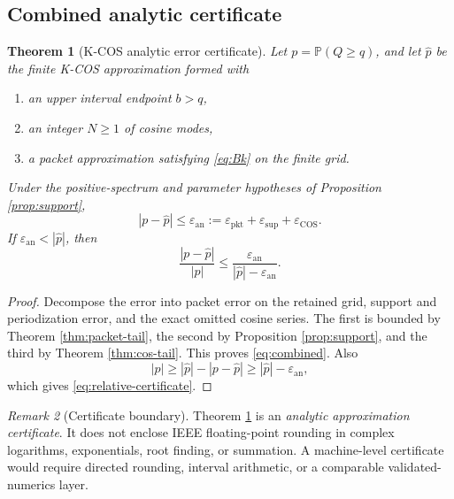 \documentclass[11pt]{article}
\newtheorem{theorem}{Theorem}[section]
\theoremstyle{definition}
\theoremstyle{remark}
\newtheorem{remark}[theorem]{Remark}
\newcommand{\Pp}{\mathbb P}
\newcommand{\eps}{\varepsilon}
\begin{document}
\subsection{Combined analytic certificate}

\begin{theorem}[K-COS analytic error certificate]
\label{thm:combined}
Let $p=\Pp(Q\ge q)$, and let $\widehat p$ be the finite K-COS approximation formed with
\begin{enumerate}[label=(\roman*)]
\item an upper interval endpoint $b>q$,
\item an integer $N\ge1$ of cosine modes,
\item a packet approximation satisfying \eqref{eq:Bk} on the finite grid.
\end{enumerate}
Under the positive-spectrum and parameter hypotheses of Proposition \ref{prop:support},
\begin{equation}
|p-\widehat p|
\le
\eps_{\mathrm{an}}
:=\eps_{\mathrm{pkt}}+\eps_{\mathrm{sup}}+\eps_{\mathrm{COS}}.
\label{eq:combined}
\end{equation}
If $\eps_{\mathrm{an}}<|\widehat p|$, then
\begin{equation}
\frac{|p-\widehat p|}{|p|}
\le
\frac{\eps_{\mathrm{an}}}
{|\widehat p|-\eps_{\mathrm{an}}}.
\label{eq:relative-certificate}
\end{equation}
\end{theorem}

\begin{proof}
Decompose the error into packet error on the retained grid, support and periodization error, and the exact omitted cosine series. The first is bounded by Theorem \ref{thm:packet-tail}, the second by Proposition \ref{prop:support}, and the third by Theorem \ref{thm:cos-tail}. This proves \eqref{eq:combined}. Also
\[
|p|\ge |\widehat p|-|p-\widehat p|
\ge |\widehat p|-\eps_{\mathrm{an}},
\]
which gives \eqref{eq:relative-certificate}.
\end{proof}

\begin{remark}[Certificate boundary]\label{claim:final-26-12}
Theorem \ref{thm:combined} is an \emph{analytic approximation certificate}. It does not enclose IEEE floating-point rounding in complex logarithms, exponentials, root finding, or summation. A machine-level certificate would require directed rounding, interval arithmetic, or a comparable validated-numerics layer.
\end{remark}
\end{document}
